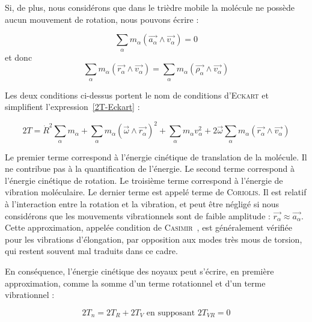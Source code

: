 \documentclass[12pt,a4paper]{book}
\begin{document}
Si, de plus, nous considérons que dans le trièdre mobile la molécule ne possède aucun mouvement de rotation, nous pouvons écrire :

\begin{equation}
\sum_{\alpha}m_{\alpha}\left(\stackrel{\rightarrow}{a_{\alpha}} \wedge \stackrel{\rightarrow}{v_{\alpha}}\right) = 0
\end{equation}
\noindent et donc
\begin{equation}
\sum_{\alpha}m_{\alpha}\left(\stackrel{\rightarrow}{r_{\alpha}} \wedge \stackrel{\rightarrow}{v_{\alpha}}\right) = \sum_{\alpha}m_{\alpha}\left(\stackrel{\rightarrow}{\rho_{\alpha}} \wedge \stackrel{\rightarrow}{v_{\alpha}}\right)
\end{equation}

Les deux conditions ci-dessus portent le nom de conditions d'\textsc{Eckart} et simplifient l'expression~\ref{2T-Eckart} :

\begin{equation}
2T = \dot{R}^2\sum_{\alpha}m_{\alpha} + \sum_{\alpha}m_{\alpha}\left(\stackrel{\rightarrow}{\omega} \wedge \stackrel{\rightarrow}{r_{\alpha}}\right)^2 + \sum_{\alpha}m_{\alpha}v^2_{\alpha} + 2\stackrel{\rightarrow}{\omega}\sum_{\alpha}m_{\alpha}\left(\stackrel{\rightarrow}{r_{\alpha}} \wedge \stackrel{\rightarrow}{v_{\alpha}}\right)
\end{equation}

Le premier terme correspond à l'énergie cinétique de translation de la molécule. Il ne contribue pas à la quantification de l'énergie. Le second terme correspond  à l'énergie cinétique de rotation. Le troisième terme correspond à l'énergie de vibration moléculaire. Le dernier terme est appelé terme de \textsc{Coriolis}. Il est relatif à l'interaction entre la rotation et la vibration, et peut être négligé si nous considérons que les mouvements vibrationnels sont de faible amplitude : $\stackrel{\rightarrow}{r_{\alpha}} \approx \stackrel{\rightarrow}{a_{\alpha}}$. Cette approximation,  appelée condition de \textsc{Casimir}~\cite{casimir1931rotation}, est généralement vérifiée pour les vibrations d'élongation, par opposition aux modes très mous de torsion, qui restent souvent mal traduits dans ce cadre.

En conséquence, l'énergie cinétique des noyaux peut s'écrire, en première approximation, comme la somme d'un terme rotationnel et d'un terme vibrationnel :

\begin{equation}
2T_n = 2T_R + 2 T_V \text{ en supposant }2T_{VR} = 0
\end{equation}
\end{document}
